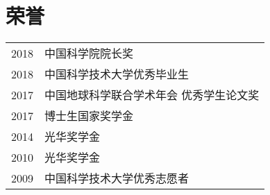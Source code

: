 \section*{荣誉}

\begin{tabular}{p{} p{}}
2018 & 中国科学院院长奖 \\
2018 & 中国科学技术大学优秀毕业生 \\
2017 & 中国地球科学联合学术年会 优秀学生论文奖 \\
2017 & 博士生国家奖学金 \\
2014 & 光华奖学金 \\
2010 & 光华奖学金 \\
2009 & 中国科学技术大学优秀志愿者 \\
\end{tabular}
